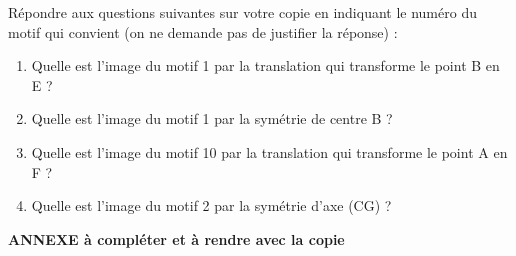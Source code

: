 \begin{enumerate}
\begin{center}

    \end{center}
    
    Répondre aux questions suivantes sur votre copie en indiquant le numéro du motif qui convient (on ne demande pas de justifier la réponse) :
    \begin{enumerate}
        \item Quelle est l'image du motif 1 par la translation qui transforme le point B en E ?
        \item Quelle est l'image du motif 1 par la symétrie de centre B ?
        \item Quelle est l'image du motif 10 par la translation qui transforme le point A en F ?
        \item Quelle est l'image du motif 2 par la symétrie d'axe (CG) ?
    \end{enumerate}	
\end{enumerate}

\newpage
\begin{center}
\textbf{\large ANNEXE à compléter et à rendre avec la copie }
\end{center}

